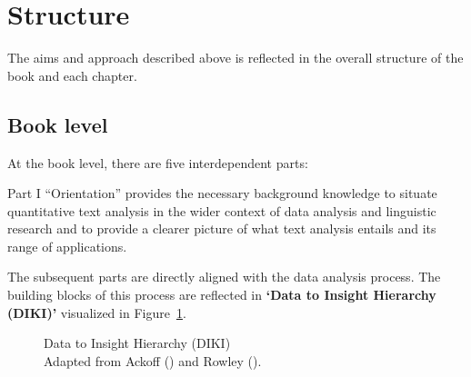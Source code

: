 \documentclass[
  letterpaper,
]{book}
\theoremstyle{definition}
\theoremstyle{remark}
\begin{document}
\section*{Structure}\label{sec-preface-structure}


The aims and approach described above is reflected in the overall
structure of the book and each chapter.

\subsection*{Book level}\label{sec-preface-structure-book}

At the book level, there are five interdependent parts:

Part I ``Orientation'' provides the necessary background knowledge to
situate quantitative text analysis in the wider context of data analysis
and linguistic research and to provide a clearer picture of what text
analysis entails and its range of applications.

The subsequent parts are directly aligned with the data analysis
process. The building blocks of this process are reflected in
\textbf{`Data to Insight Hierarchy
(DIKI)'} visualized in Figure~\ref{fig-diki-hierarchy}.

\begin{figure}[!htb]


\caption{\label{fig-diki-hierarchy}Data to Insight Hierarchy (DIKI)\\
Adapted from Ackoff () and Rowley
().}

\end{figure}%
\end{document}
